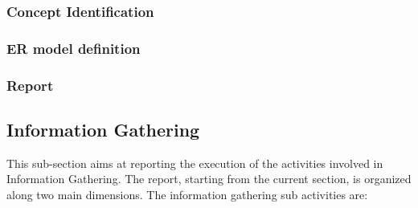 \subsubsection{Concept Identification}
\subsubsection{ER model definition}
\subsubsection{Report}






\subsection{Information Gathering}
This sub-section aims at reporting the execution of the activities involved in Information Gathering. The report, starting from the current section, is organized along two main dimensions. The information gathering sub activities are:
